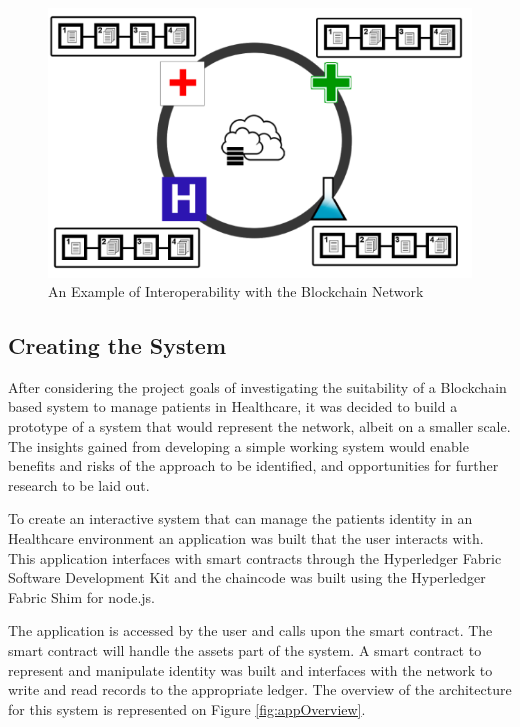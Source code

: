 \begin{figure}[ht] \centering
\includegraphics[width=0.7\linewidth]{imgs/interoperability.png}
\caption{\label{fig:interoperability}An Example of Interoperability with the
Blockchain Network} \end{figure}

\subsection{Creating the System} After considering the project goals of
investigating the suitability of a Blockchain based system to manage patients
in Healthcare, it was decided to build a prototype of a system that would
represent the network, albeit on a smaller scale. The insights gained from
developing a simple working system would enable benefits and risks of the
approach to be identified, and opportunities for further research to be laid
out.

To create an interactive system that can manage the patients identity in an
Healthcare environment an application was built that the user interacts with.
This application interfaces with smart contracts through the Hyperledger Fabric
Software Development Kit and the chaincode was built using the Hyperledger
Fabric Shim for node.js.

The application is accessed by the user and calls upon the smart contract.  The
smart contract will handle the assets part of the system.  A smart contract to
represent and manipulate identity was built and interfaces with the network to
write and read records to the appropriate ledger. The overview of the
architecture for this system is represented on Figure \ref{fig:appOverview}.

